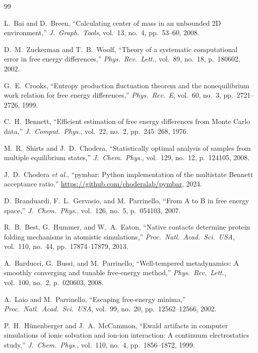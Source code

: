 \documentclass[conference]{IEEEtran}
\begin{document}
\begin{thebibliography}{99}

L.~Bai and D.~Breen,
``Calculating center of mass in an unbounded 2D environment,''
\textit{J.\ Graph.\ Tools}, vol.~13, no.~4, pp.~53--60, 2008.

D.~M.~Zuckerman and T.~B.~Woolf,
``Theory of a systematic computational error in free energy differences,''
\textit{Phys.\ Rev.\ Lett.}, vol.~89, no.~18, p.~180602, 2002.

G.~E.~Crooks,
``Entropy production fluctuation theorem and the nonequilibrium work
relation for free energy differences,''
\textit{Phys.\ Rev.\ E}, vol.~60, no.~3, pp.~2721--2726, 1999.

C.~H.~Bennett,
``Efficient estimation of free energy differences from Monte Carlo data,''
\textit{J.\ Comput.\ Phys.}, vol.~22, no.~2, pp.~245--268, 1976.

M.~R.~Shirts and J.~D.~Chodera,
``Statistically optimal analysis of samples from multiple equilibrium
states,''
\textit{J.\ Chem.\ Phys.}, vol.~129, no.~12, p.~124105, 2008.

J.~D.~Chodera \textit{et al.},
``pymbar: Python implementation of the multistate Bennett acceptance
ratio,'' \url{https://github.com/choderalab/pymbar}, 2024.

D.~Branduardi, F.~L.~Gervasio, and M.~Parrinello,
``From A to B in free energy space,''
\textit{J.\ Chem.\ Phys.}, vol.~126, no.~5, p.~054103, 2007.

R.~B.~Best, G.~Hummer, and W.~A.~Eaton,
``Native contacts determine protein folding mechanisms in atomistic
simulations,''
\textit{Proc.\ Natl.\ Acad.\ Sci.\ USA}, vol.~110, no.~44,
pp.~17874--17879, 2013.

A.~Barducci, G.~Bussi, and M.~Parrinello,
``Well-tempered metadynamics: A smoothly converging and tunable
free-energy method,''
\textit{Phys.\ Rev.\ Lett.}, vol.~100, no.~2, p.~020603, 2008.

A.~Laio and M.~Parrinello,
``Escaping free-energy minima,''
\textit{Proc.\ Natl.\ Acad.\ Sci.\ USA}, vol.~99, no.~20,
pp.~12562--12566, 2002.

P.~H.~H\"unenberger and J.~A.~McCammon,
``Ewald artifacts in computer simulations of ionic solvation and
ion-ion interaction: A continuum electrostatics study,''
\textit{J.\ Chem.\ Phys.}, vol.~110, no.~4, pp.~1856--1872, 1999.


\end{thebibliography}
\end{document}
